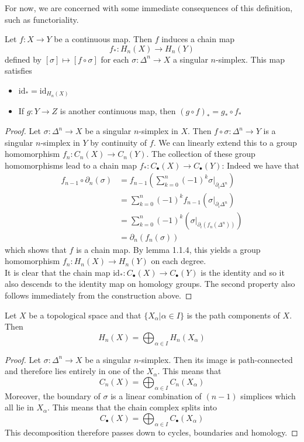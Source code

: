 \documentclass[a4paper]{article}
\begin{document}
For now, we are concerned with some immediate consequences of this definition, such as functoriality. 

\begin{prp}{}{} Let $f:X\to Y$ be a continuous map. Then $f$ induces a chain map $$f_\ast:H_n(X)\to H_n(Y)$$ defined by $[\sigma]\mapsto[f\circ\sigma]$ for each $\sigma:\Delta^n\to X$ a singular $n$-simplex. This map satisfies 
\begin{itemize}
\item $\text{id}_\ast=\text{id}_{H_n(X)}$
\item If $g:Y\to Z$ is another continuous map, then $(g\circ f)_\ast=g_\ast\circ f_\ast$
\end{itemize} 
\begin{proof}
Let $\sigma:\Delta^n\to X$ be a singular $n$-simplex in $X$. Then $f\circ\sigma:\Delta^n\to Y$ is a singular $n$-simplex in $Y$ by continuity of $f$. We can linearly extend this to a group homomorphism $f_n:C_n(X)\to C_n(Y)$. The collection of these group homomorphisms lead to a chain map $f_\ast:C_\bullet(X)\to C_\bullet(Y)$: Indeed we have that 
\begin{align*}
f_{n-1}\circ\partial_n(\sigma)&=f_{n-1}\left(\sum_{k=0}^n(-1)^k\sigma|_{\partial_i\Delta^n}\right)\\
&=\sum_{k=0}^n(-1)^kf_{n-1}\left(\sigma|_{\partial_i\Delta^n}\right)\\
&=\sum_{k=0}^n(-1)^k\left(\sigma|_{\partial_i(f_n(\Delta^n))}\right)\\
&=\partial_n(f_n(\sigma))
\end{align*}
which shows that $f$ is a chain map. By lemma 1.1.4, this yields a group homomorphism $f_n:H_n(X)\to H_n(Y)$ on each degree. \\

It is clear that the chain map $\text{id}_\ast:C_\bullet(X)\to C_\bullet(Y)$ is the identity and so it also descends to the identity map on homology groups. The second property also follows immediately from the construction above. 
\end{proof}
\end{prp}

\begin{prp}{}{} Let $X$ be a topological space and that $\{X_\alpha|\alpha\in I\}$ is the path components of $X$. Then $$H_n(X)=\bigoplus_{\alpha\in I} H_n(X_\alpha)$$ 
\begin{proof}
Let $\sigma:\Delta^n\to X$ be a singular $n$-simplex. Then its image is path-connected and therefore lies entirely in one of the $X_\alpha$. This means that $$C_n(X)=\bigoplus_{\alpha\in I}C_n(X_\alpha)$$ Moreover, the boundary of $\sigma$ is a linear combination of $(n-1)$ simplices which all lie in $X_\alpha$. This means that the chain complex splits into $$C_\bullet(X)=\bigoplus_{\alpha\in I}C_\bullet(X_\alpha)$$ This decomposition therefore passes down to cycles, boundaries and homology. 
\end{proof}
\end{prp}
\end{document}
